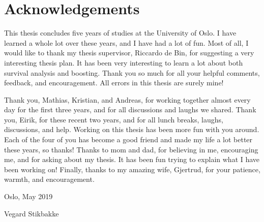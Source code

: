 \chapter{Acknowledgements}
This thesis concludes five years of studies at the University of Oslo.
I have learned a whole lot over these years, and I have had a lot of fun.
Most of all, I would like to thank my thesis supervisor, Riccardo de Bin, for suggesting a very interesting thesis plan.
It has been very interesting to learn a lot about both survival analysis and boosting.
Thank you so much for all your helpful comments, feedback, and encouragement.
All errors in this thesis are surely mine!

Thank you, Mathias, Kristian, and Andreas, for working together almost every day for the first three years, and for all discussions and laughs we shared.
Thank you, Eirik, for these recent two years, and for all lunch breaks, laughs, discussions, and help.
Working on this thesis has been more fun with you around.
Each of the four of you has become a good friend and made my life a lot better these years, so thanks!
Thanks to mom and dad, for believing in me, encouraging me, and for asking about my thesis.
It has been fun trying to explain what I have been working on!
Finally, thanks to my amazing wife, Gjertrud, for your patience, warmth, and encouragement.

\begin{flushright}
Oslo, May 2019
\end{flushright}
\begin{flushright}
Vegard Stikbakke
\end{flushright}